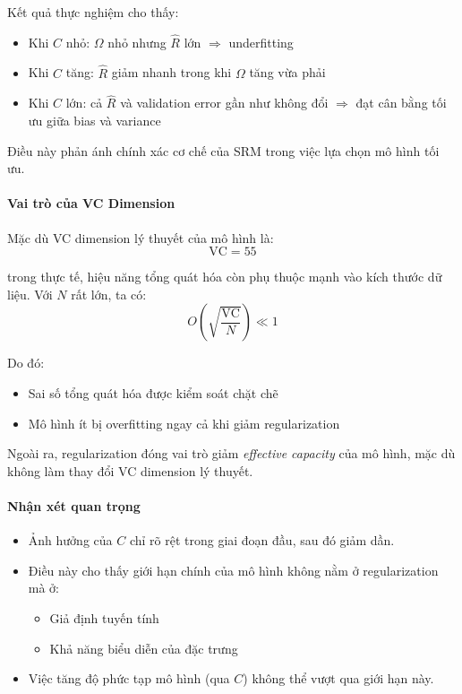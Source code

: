 Kết quả thực nghiệm cho thấy:

\begin{itemize}
    \item Khi $C$ nhỏ: $\Omega$ nhỏ nhưng $\hat{R}$ lớn $\Rightarrow$ underfitting
    
    \item Khi $C$ tăng: $\hat{R}$ giảm nhanh trong khi $\Omega$ tăng vừa phải
    
    \item Khi $C$ lớn: cả $\hat{R}$ và validation error gần như không đổi $\Rightarrow$ đạt cân bằng tối ưu giữa bias và variance
\end{itemize}

Điều này phản ánh chính xác cơ chế của SRM trong việc lựa chọn mô hình tối ưu.

\paragraph{Vai trò của VC Dimension}

Mặc dù VC dimension lý thuyết của mô hình là:
\[
\text{VC} = 55
\]

trong thực tế, hiệu năng tổng quát hóa còn phụ thuộc mạnh vào kích thước dữ liệu. Với $N$ rất lớn, ta có:
\[
O\left(\sqrt{\frac{\text{VC}}{N}}\right) \ll 1
\]

Do đó:
\begin{itemize}
    \item Sai số tổng quát hóa được kiểm soát chặt chẽ
    \item Mô hình ít bị overfitting ngay cả khi giảm regularization
\end{itemize}

Ngoài ra, regularization đóng vai trò giảm \textit{effective capacity} của mô hình, mặc dù không làm thay đổi VC dimension lý thuyết.

\paragraph{Nhận xét quan trọng}

\begin{itemize}
    \item Ảnh hưởng của $C$ chỉ rõ rệt trong giai đoạn đầu, sau đó giảm dần.
    
    \item Điều này cho thấy giới hạn chính của mô hình không nằm ở regularization mà ở:
    \begin{itemize}
        \item Giả định tuyến tính
        \item Khả năng biểu diễn của đặc trưng
    \end{itemize}

    \item Việc tăng độ phức tạp mô hình (qua $C$) không thể vượt qua giới hạn này.
\end{itemize}

